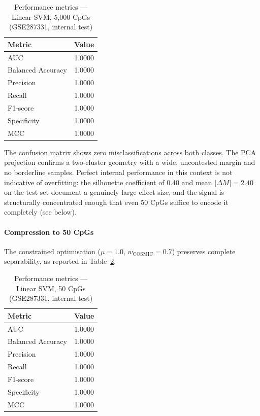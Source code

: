 \begin{table}[H]
\centering
\caption{Performance metrics — Linear SVM, 5,000 CpGs
         (GSE287331, internal test)}
\label{tab:gse287331_5k}
\begin{tabular}{lc}
\toprule
Metric & Value \\
\midrule
AUC               & 1.0000 \\
Balanced Accuracy & 1.0000 \\
Precision         & 1.0000 \\
Recall            & 1.0000 \\
F1-score          & 1.0000 \\
Specificity       & 1.0000 \\
MCC               & 1.0000 \\
\bottomrule
\end{tabular}
\end{table}

The confusion matrix shows zero misclassifications across
both classes. The PCA projection confirms a two-cluster
geometry with a wide, uncontested margin and no borderline
samples. Perfect internal performance in this context is
not indicative of overfitting: the silhouette coefficient
of 0.40 and mean $|\Delta M| = 2.40$ on the test set
document a genuinely large effect size, and the signal is
structurally concentrated enough that even 50 CpGs suffice
to encode it completely (see below).

\paragraph{Compression to 50 CpGs}

The constrained optimisation ($\mu = 1.0$,
$w_{\mathrm{COSMIC}} = 0.7$) preserves complete
separability, as reported in Table~\ref{tab:gse287331_50}.

\begin{table}[H]
\centering
\caption{Performance metrics — Linear SVM, 50 CpGs
         (GSE287331, internal test)}
\label{tab:gse287331_50}
\begin{tabular}{lc}
\toprule
Metric & Value \\
\midrule
AUC               & 1.0000 \\
Balanced Accuracy & 1.0000 \\
Precision         & 1.0000 \\
Recall            & 1.0000 \\
F1-score          & 1.0000 \\
Specificity       & 1.0000 \\
MCC               & 1.0000 \\
\bottomrule
\end{tabular}
\end{table}

